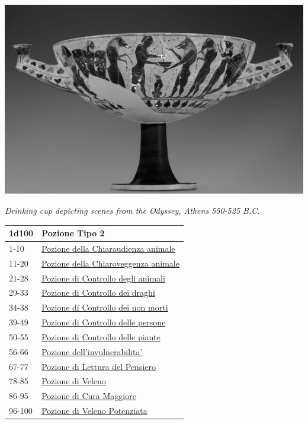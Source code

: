 \begin{multicols}{2}
{\begin{center}
\includegraphics[width=0.8\linewidth]{immagini/cupdrinking.png}

\emph{Drinking cup depicting scenes from the Odyssey, Athens 550-525 B.C.}
\end{center}
\hypertarget{Pozione Tipo 2}{}
{\small\begin{tabular}{ll}
		\toprule
\textbf{1d100} & \textbf{Pozione Tipo 2}\\
\toprule
1-10 & \hyperlink{Pozione della Chiaraudienzaa nimale}{Pozione della Chiaraudienza animale}\\
11-20 & \hyperlink{Pozione della Chiaroveggenza animale}{Pozione della Chiaroveggenza animale}\\
21-28 & \hyperlink{Pozione di Controllo degli animali}{Pozione di Controllo degli animali}\\
29-33 & \hyperlink{Pozione di Controllo dei draghi}{Pozione di Controllo dei draghi}\\
34-38 & \hyperlink{Pozione di Controllo dei nonmorti}{Pozione di Controllo dei non morti}\\
39-49 & \hyperlink{Pozione di Controllo delle persone}{Pozione di Controllo delle persone}\\
50-55 & \hyperlink{Pozione di Controllo delle piante}{Pozione di Controllo delle piante}\\
56-66 & \hyperlink{Pozione dell'invulnerabilita'}{Pozione dell'invulnerabilita'}\\
67-77 & \hyperlink{Pozione di Letturadel Pensiero}{Pozione di Lettura del Pensiero}\\
78-85 & \hyperlink{Pozione di Veleno}{Pozione di Veleno}\\
86-95 & \hyperlink{pozionifiltri}{Pozione di Cura Maggiore}\\
96-100 & \hyperlink{pozionifiltri}{Pozione di Veleno Potenziata}
\end{tabular}}

}
\end{multicols}

